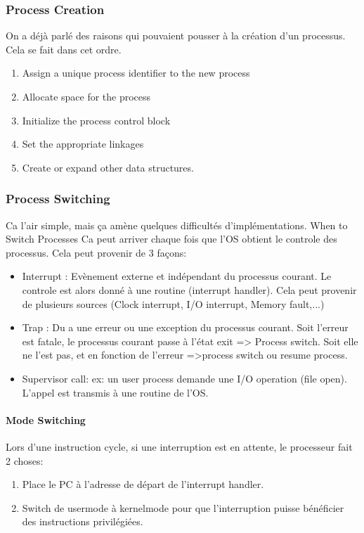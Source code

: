 \subsubsection{Process Creation}
On a déjà parlé des raisons qui pouvaient pousser à la création d'un processus.
Cela se fait dans cet ordre.
\begin{enumerate}
  \item Assign a unique process identifier to the new process
  \item Allocate space for the process
  \item Initialize the process control block
  \item Set the appropriate linkages
  \item Create or expand other data structures.
\end{enumerate}

\subsubsection{Process Switching}
Ca l'air simple, mais ça amène quelques difficultés d'implémentations.
When to Switch Processes
Ca peut arriver chaque fois que l'OS obtient le controle des processus.
Cela peut provenir de 3 façons:
\begin{itemize}
  \item Interrupt : Evènement externe et indépendant du processus courant.
Le controle est alors donné à une routine (interrupt handler).
Cela peut provenir de plusieurs sources (Clock interrupt, I/O interrupt, Memory fault,...)
  \item Trap : Du a une erreur ou une exception du processus courant.
Soit l'erreur est fatale, le processus courant passe à l'état exit => Process switch.
Soit elle ne l'est pas, et en fonction de l'erreur =>process switch ou resume process.
  \item Supervisor call: ex: un user process demande une I/O operation (file open).
L'appel est transmis à une routine de l'OS.
\end{itemize}
\paragraph{Mode Switching}
Lors d'une instruction cycle, si une interruption est en attente, le processeur fait 2 choses:
\begin{enumerate}
  \item Place le PC à l'adresse de départ de l'interrupt handler.
  \item Switch de usermode à kernelmode pour que l'interruption puisse bénéficier des instructions privilégiées.
\end{enumerate}
